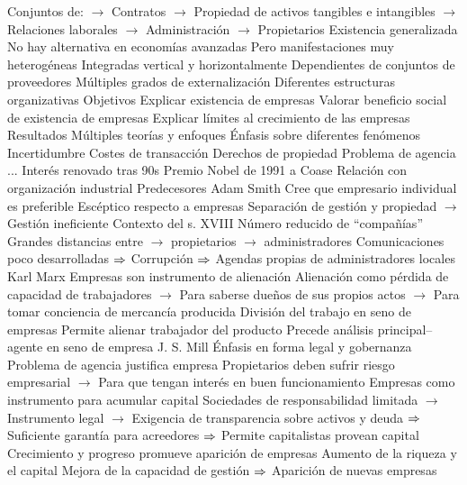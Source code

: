 \documentclass{nuevotema}
\begin{document}
\begin{esquemal}
				\4 Conjuntos de:
				\4[] $\to$ Contratos
				\4[] $\to$ Propiedad de activos tangibles e intangibles
				\4[] $\to$ Relaciones laborales
				\4[] $\to$ Administración
				\4[] $\to$ Propietarios
				\4 Existencia generalizada
				\4[] No hay alternativa en economías avanzadas
				\4 Pero manifestaciones muy heterogéneas
				\4[] Integradas vertical y horizontalmente
				\4[] Dependientes de conjuntos de proveedores
				\4[] Múltiples grados de externalización
				\4[] Diferentes estructuras organizativas
			\3 Objetivos
				\4 Explicar existencia de empresas
				\4 Valorar beneficio social de existencia de empresas
				\4 Explicar límites al crecimiento de las empresas
			\3 Resultados
				\4 Múltiples teorías y enfoques
				\4 Énfasis sobre diferentes fenómenos
				\4[] Incertidumbre
				\4[] Costes de transacción
				\4[] Derechos de propiedad
				\4[] Problema de agencia
				\4[] ...
				\4 Interés renovado tras 90s
				\4[] Premio Nobel de 1991 a Coase
				\4 Relación con organización industrial
		\2 Predecesores
			\3 Adam Smith
				\4 Cree que empresario individual es preferible
				\4 Escéptico respecto a empresas
				\4[] Separación de gestión y propiedad
				\4[] $\to$ Gestión ineficiente
				\4 Contexto del s. XVIII
				\4[] Número reducido de ``compañías''
				\4[] Grandes distancias entre
				\4[] $\to$ propietarios
				\4[] $\to$ administradores
				\4[] Comunicaciones poco desarrolladas
				\4[] $\Rightarrow$ Corrupción
				\4[] $\Rightarrow$ Agendas propias de administradores locales
			\3 Karl Marx
				\4 Empresas son instrumento de alienación
				\4[] Alienación como pérdida de capacidad de trabajadores
				\4[] $\to$ Para saberse dueños de sus propios actos
				\4[] $\to$ Para tomar conciencia de mercancía producida
				\4 División del trabajo en seno de empresas
				\4[] Permite alienar trabajador del producto
				\4 Precede análisis principal--agente en seno de empresa
			\3 J. S. Mill
				\4 Énfasis en forma legal y gobernanza
				\4 Problema de agencia justifica empresa
				\4[] Propietarios deben sufrir riesgo empresarial
				\4[] $\to$ Para que tengan interés en buen funcionamiento
				\4 Empresas como instrumento para acumular capital
				\4[] Sociedades de responsabilidad limitada
				\4[] $\to$ Instrumento legal
				\4[] $\to$ Exigencia de transparencia sobre activos y deuda
				\4[] $\Rightarrow$ Suficiente garantía para acreedores
				\4[] $\Rightarrow$ Permite capitalistas provean capital
				\4 Crecimiento y progreso promueve aparición de empresas
				\4[] Aumento de la riqueza y el capital
				\4[] Mejora de la capacidad de gestión
				\4[] $\Rightarrow$ Aparición de nuevas empresas

\end{esquemal}
\end{document}
